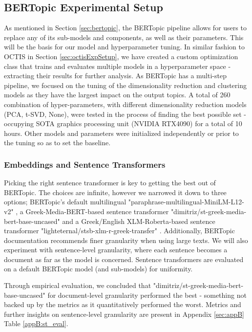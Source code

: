 \subsection{BERTopic Experimental Setup}
As mentioned in Section \ref{sec:bertopic}, the BERTopic pipeline allows for users to replace any of its sub-models and components, as well as their parameters. This will be the basis for our model and hyperparameter tuning. In similar fashion to OCTIS in Section \ref{sec:octisExpSetup}, we have created a custom optimization class that trains and evaluates multiple models in a hyperparameter space - extracting their results for further analysis. As BERTopic has a multi-step pipeline, we focused on the tuning of the dimensionality reduction and clustering models as they have the largest impact on the output topics. A total of 260 combination of hyper-parameters, with different dimensionality reduction models (PCA, t-SVD, None), were tested in the process of finding the best possible set - occupying SOTA graphics processing unit (NVIDIA RTX4090) for a total of 10 hours. Other models and parameters were initialized independently or prior to the tuning so as to set the baseline.

\subsubsection{Embeddings and Sentence Transformers}
Picking the right sentence transformer is key to getting the best out of BERTopic. The choices are infinite, however we narrowed it down to three options; BERTopic's default multilingual "paraphrase-multilingual-MiniLM-L12-v2" \citep{Reimers;Gurevych:19}, a Greek-Media-BERT-based sentence transformer "dimitriz/st-greek-media-bert-base-uncased" \citep{Zaikis;Kokkas;Vlahavas:23} and a Greek/English XLM-Roberta-based sentence transformer "lighteternal/stsb-xlm-r-greek-transfer" \citep{Papadopoulos;TUC;SSE:19}. Additionally, BERTopic documentation recommends finer granularity when using large texts. We will also experiment with sentence-level granularity, where each sentence becomes a document as far as the model is concerned. Sentence transformers are evaluated on a default BERTopic model (and sub-models) for uniformity.

Through empirical evaluation, we concluded that "dimitriz/st-greek-media-bert-base-uncased" for document-level granularity performed the best - something not backed up by the metrics as it quantitatively performed the worst. Metrics and further insights on sentence-level granularity are present in Appendix \ref{sec:appB} Table \ref{appB:st_eval}.

